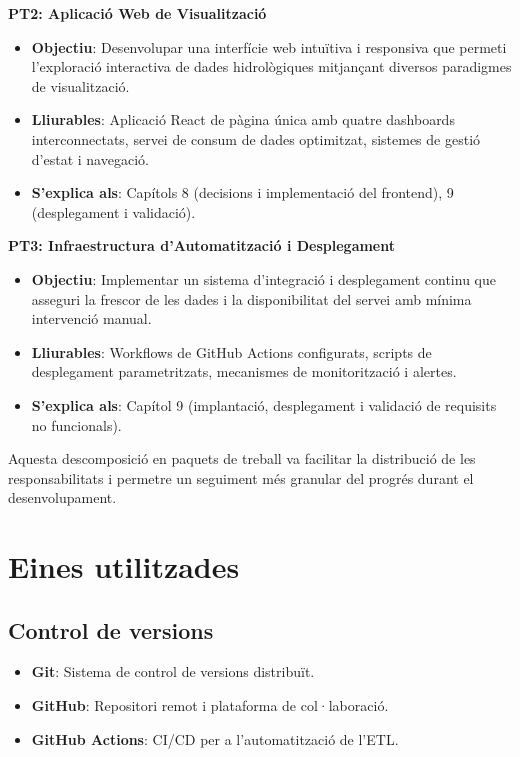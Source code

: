\textbf{PT2: Aplicació Web de Visualització}
\begin{itemize}
    \item \textbf{Objectiu}: Desenvolupar una interfície web intuïtiva i responsiva que permeti l'exploració interactiva de dades hidrològiques mitjançant diversos paradigmes de visualització.
    \item \textbf{Lliurables}: Aplicació React de pàgina única amb quatre dashboards interconnectats, servei de consum de dades optimitzat, sistemes de gestió d'estat i navegació.
    \item \textbf{S'explica als}: Capítols 8 (decisions i implementació del frontend), 9 (desplegament i validació).
\end{itemize}

\textbf{PT3: Infraestructura d'Automatització i Desplegament}
\begin{itemize}
    \item \textbf{Objectiu}: Implementar un sistema d'integració i desplegament continu que asseguri la frescor de les dades i la disponibilitat del servei amb mínima intervenció manual.
    \item \textbf{Lliurables}: Workflows de GitHub Actions configurats, scripts de desplegament parametritzats, mecanismes de monitorització i alertes.
    \item \textbf{S'explica als}: Capítol 9 (implantació, desplegament i validació de requisits no funcionals).
\end{itemize}

Aquesta descomposició en paquets de treball va facilitar la distribució de les responsabilitats i permetre un seguiment més granular del progrés durant el desenvolupament.


\section{Eines utilitzades}

\subsection{Control de versions}
\begin{itemize}
    \item \textbf{Git}: Sistema de control de versions distribuït.
    \item \textbf{GitHub}: Repositori remot i plataforma de col·laboració.
    \item \textbf{GitHub Actions}: CI/CD per a l'automatització de l'ETL.
\end{itemize}


